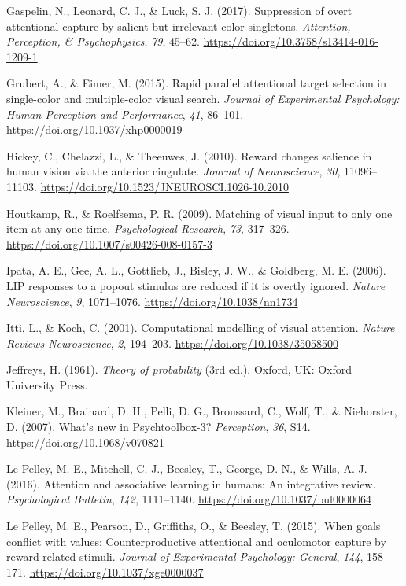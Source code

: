 \documentclass[man, a4paper, noextraspace, 11pt,floatsintext]{apa6}
\theoremstyle{definition}
\theoremstyle{definition}
\theoremstyle{definition}
\theoremstyle{remark}
\begin{document}
\hypertarget{ref-Gaspelin2016}{}
Gaspelin, N., Leonard, C. J., \& Luck, S. J. (2017). Suppression of
overt attentional capture by salient-but-irrelevant color singletons.
\emph{Attention, Perception, \& Psychophysics}, \emph{79}, 45--62.
\url{https://doi.org/10.3758/s13414-016-1209-1}

\hypertarget{ref-Grubert2015}{}
Grubert, A., \& Eimer, M. (2015). Rapid parallel attentional target
selection in single-color and multiple-color visual search.
\emph{Journal of Experimental Psychology: Human Perception and
Performance}, \emph{41}, 86--101.
\url{https://doi.org/10.1037/xhp0000019}

\hypertarget{ref-Hickey2010}{}
Hickey, C., Chelazzi, L., \& Theeuwes, J. (2010). Reward changes
salience in human vision via the anterior cingulate. \emph{Journal of
Neuroscience}, \emph{30}, 11096--11103.
\url{https://doi.org/10.1523/JNEUROSCI.1026-10.2010}

\hypertarget{ref-Houtkamp2009}{}
Houtkamp, R., \& Roelfsema, P. R. (2009). Matching of visual input to
only one item at any one time. \emph{Psychological Research}, \emph{73},
317--326. \url{https://doi.org/10.1007/s00426-008-0157-3}

\hypertarget{ref-Ipata2006}{}
Ipata, A. E., Gee, A. L., Gottlieb, J., Bisley, J. W., \& Goldberg, M.
E. (2006). LIP responses to a popout stimulus are reduced if it is
overtly ignored. \emph{Nature Neuroscience}, \emph{9}, 1071--1076.
\url{https://doi.org/10.1038/nn1734}

\hypertarget{ref-Itti2001}{}
Itti, L., \& Koch, C. (2001). Computational modelling of visual
attention. \emph{Nature Reviews Neuroscience}, \emph{2}, 194--203.
\url{https://doi.org/10.1038/35058500}

\hypertarget{ref-Jeffreys1961}{}
Jeffreys, H. (1961). \emph{Theory of probability} (3rd ed.). Oxford, UK:
Oxford University Press.

\hypertarget{ref-Kleiner2007}{}
Kleiner, M., Brainard, D. H., Pelli, D. G., Broussard, C., Wolf, T., \&
Niehorster, D. (2007). What's new in Psychtoolbox-3? \emph{Perception},
\emph{36}, S14. \url{https://doi.org/10.1068/v070821}

\hypertarget{ref-LePelleya}{}
Le Pelley, M. E., Mitchell, C. J., Beesley, T., George, D. N., \& Wills,
A. J. (2016). Attention and associative learning in humans: An
integrative review. \emph{Psychological Bulletin}, \emph{142},
1111--1140. \url{https://doi.org/10.1037/bul0000064}

\hypertarget{ref-LePelley2015b}{}
Le Pelley, M. E., Pearson, D., Griffiths, O., \& Beesley, T. (2015).
When goals conflict with values: Counterproductive attentional and
oculomotor capture by reward-related stimuli. \emph{Journal of
Experimental Psychology: General}, \emph{144}, 158--171.
\url{https://doi.org/10.1037/xge0000037}
\end{document}
